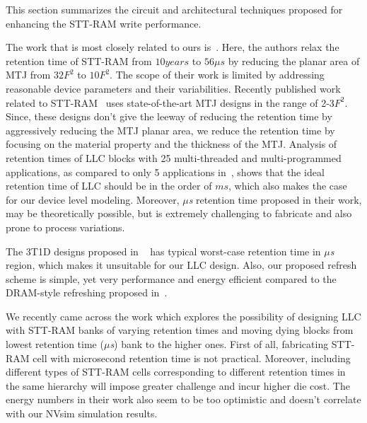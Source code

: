 


This section summarizes the circuit and architectural techniques proposed for enhancing the STT-RAM
write performance.

The work that is most closely related to ours is~\cite{STTRAM:HPCA11}.
Here, the authors relax the retention time of STT-RAM from $10 years$ to $56 \mu s$ by
reducing the planar area of MTJ from $32F^2$ to $10F^2$. The scope of their work is limited by
addressing reasonable device parameters and their variabilities. Recently published work related to 
STT-RAM~\cite{PMTJ:Toshiba08,STTRAM:EDL11,STTRAM:Qualcomm09,STTRAM:Grandis11} 
uses state-of-the-art MTJ designs in the range of 2-3$F^2$. Since, these designs don't give the
leeway of reducing the retention time by aggressively reducing the MTJ planar area, we reduce the
retention time by focusing on the material property and the thickness of the MTJ. 
Analysis of
retention times of LLC blocks with 25 multi-threaded and multi-programmed applications, 
as compared to only 5 applications in~\cite{STTRAM:HPCA11}, shows that 
the ideal retention time of LLC should be in the order of $ms$, which also makes
the case for our device level modeling. Moreover, {\it $\mu$s} retention time proposed
in their work, may be theoretically possible, but is extremely challenging to 
fabricate and also prone to process variations. 


The 3T1D designs proposed in
~\cite{3T-brooks} has typical worst-case retention time in {\it $\mu$s} region,
which makes it unsuitable for our LLC design. Also, our proposed refresh scheme is simple, yet 
very performance and energy efficient compared to the DRAM-style refreshing 
proposed in~\cite{STTRAM:HPCA11}. 

We recently came across the work which explores the possibility of designing LLC with STT-RAM banks of varying 
retention times and moving dying blocks from lowest retention time ({\it $\mu$s}) bank to the higher ones. First of all, fabricating STT-RAM cell with microsecond retention time is not practical. Moreover, including different types of STT-RAM cells corresponding to different retention times in the same hierarchy will impose greater challenge and incur higher die cost. The energy numbers in their work also seem to be too optimistic and doesn't correlate with our NVsim simulation results.

